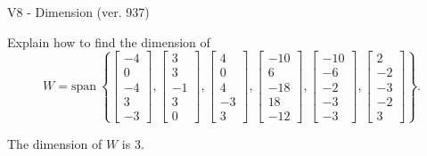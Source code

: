 \begin{exercise}
  \begin{exerciseTitle}V8 - Dimension (ver. 937)\end{exerciseTitle}
  \begin{exerciseStatement}
    Explain how to find the dimension of 
\[W=\mathrm{span}\ \left\{\left[\begin{array}{r}
-4 \\
0 \\
-4 \\
3 \\
-3
\end{array}\right] , \left[\begin{array}{r}
3 \\
3 \\
-1 \\
3 \\
0
\end{array}\right] , \left[\begin{array}{r}
4 \\
0 \\
4 \\
-3 \\
3
\end{array}\right] , \left[\begin{array}{r}
-10 \\
6 \\
-18 \\
18 \\
-12
\end{array}\right] , \left[\begin{array}{r}
-10 \\
-6 \\
-2 \\
-3 \\
-3
\end{array}\right] , \left[\begin{array}{r}
2 \\
-2 \\
-3 \\
-2 \\
3
\end{array}\right]\right\}.\]



  \end{exerciseStatement}
  \begin{exerciseAnswer}
   The dimension of \(W\) is  \(3\).
  


  \end{exerciseAnswer}
\end{exercise}